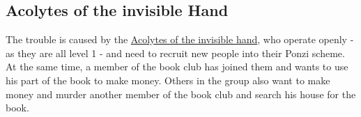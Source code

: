 \subsection{Acolytes of the invisible Hand}

The trouble is caused by the \hyperref[sec:acolytes of the invisible hand]{Acolytes of the invisible hand}, who operate openly - as they are all level 1 - and need to recruit new people into their Ponzi scheme. At the same time, a member of the book club has joined them and wants to use his part of the book to make money. Others in the group also want to make money and murder another member of the book club and search his house for the book.
